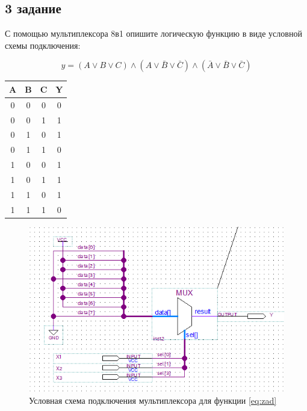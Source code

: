 \documentclass[a4paper,14pt]{article}
\begin{document}
\subsection{3 задание}

С помощью мультиплексора 8в1 опишите логическую функцию в виде
условной схемы подключения: 

\begin{equation}
y = (A \vee B \vee C) \wedge (A \vee \bar B \vee \bar C) \wedge ( \bar A \vee \bar B \vee \bar C)
\label{eq:zad}
\end{equation}

\begin{table}[H]
	\begin{center}
		\begin{flushleft}
		\end{flushleft}
		\label{tab:zad}
		\begin{tabular}{|c|c|c|c|}
			\hline
			A & B & C & Y \\ \hline
			0 & 0 & 0 & 0 \\ \hline
			0 & 0 & 1 & 1 \\ \hline
			0 & 1 & 0 & 1 \\ \hline
			0 & 1 & 1 & 0 \\ \hline
			1 & 0 & 0 & 1 \\ \hline
			1 & 0 & 1 & 1 \\ \hline
			1 & 1 & 0 & 1 \\ \hline
			1 & 1 & 1 & 0 \\ \hline
		\end{tabular}
	\end{center}
\end{table}

\begin{figure}[H]
	\centering
	\includegraphics[width=0.6\linewidth]{img/dop3_sh}
	\caption{Условная схема подключения мультиплексора для функции \ref{eq:zad}}
	\label{fig:dop3_sh}
\end{figure}
\end{document}
